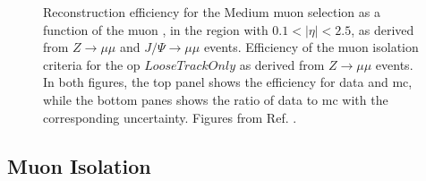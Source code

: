 \begin{figure}[h]
\begin{center}
\end{center}
 \caption{  Reconstruction efficiency for the Medium muon selection as a function of the muon \pt, in the region with $0.1<|\eta|<2.5$, as derived from $Z\rightarrow \mu \mu$ and $J/\Psi \rightarrow \mu \mu$ events. 
  Efficiency of the muon isolation criteria for the \gls{op} $LooseTrackOnly$ as derived from $Z\rightarrow \mu \mu$  events.
 In both figures, the top panel shows the efficiency for data and \gls{mc}, while the bottom panes shows the ratio of data to \gls{mc} with the corresponding uncertainty.
 Figures from Ref. \cite{Aad:2016jkr}.}
  \label{fig:obj:muon}
\end{figure}

\subsection{Muon Isolation}

